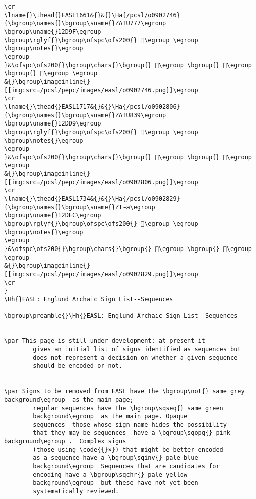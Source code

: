 \begin{verbatim}
\cr
\lname{}\thead{}EASL1661&{}&{}\Ha{/pcsl/o0902746}{\bgroup\names{}\bgroup\sname{}ZATU777\egroup
\bgroup\uname{}12D9F\egroup
\bgroup\rglyf{}\bgroup\ofspc\ofs200{} 𒶟\egroup \egroup
\bgroup\notes{}\egroup
\egroup
}&\ofspc\ofs200{}\bgroup\chars{}\bgroup{} 𒶟\egroup \bgroup{} 𒶠\egroup \bgroup{} 𒶡\egroup \egroup
&{}\bgroup\imageinline{}[[img:src=/pcsl/pepc/images/easl/o0902746.png]]\egroup
\cr
\lname{}\thead{}EASL1717&{}&{}\Ha{/pcsl/o0902806}{\bgroup\names{}\bgroup\sname{}ZATU839\egroup
\bgroup\uname{}12DD9\egroup
\bgroup\rglyf{}\bgroup\ofspc\ofs200{} 𒷙\egroup \egroup
\bgroup\notes{}\egroup
\egroup
}&\ofspc\ofs200{}\bgroup\chars{}\bgroup{} 𒷙\egroup \bgroup{} 𒷚\egroup \egroup
&{}\bgroup\imageinline{}[[img:src=/pcsl/pepc/images/easl/o0902806.png]]\egroup
\cr
\lname{}\thead{}EASL1734&{}&{}\Ha{/pcsl/o0902829}{\bgroup\names{}\bgroup\sname{}ZI∼a\egroup
\bgroup\uname{}12DEC\egroup
\bgroup\rglyf{}\bgroup\ofspc\ofs200{} 𒷬\egroup \egroup
\bgroup\notes{}\egroup
\egroup
}&\ofspc\ofs200{}\bgroup\chars{}\bgroup{} 𒷫\egroup \bgroup{} 𒷬\egroup \egroup
&{}\bgroup\imageinline{}[[img:src=/pcsl/pepc/images/easl/o0902829.png]]\egroup
\cr
}
\Hh{}EASL: Englund Archaic Sign List--Sequences

\bgroup\preamble{}\Hh{}EASL: Englund Archaic Sign List--Sequences


\par This page is still under development: at present it
	    gives an initial list of signs identified as sequences but
	    does not represent a decision on whether a given sequence
	    should be encoded or not.


\par Signs to be removed from EASL have the \bgroup\not{} same grey background\egroup  as the main page;
	    regular sequences have the \bgroup\sqseq{} same green
	    background\egroup  as the main page. Opaque
	    sequences--those whose sign name hides the possibility
	    that they may be sequences--have a \bgroup\sqopq{} pink background\egroup .  Complex signs
	    (those using \code{{}×}) that might be better encoded
	    as a sequence have a \bgroup\sqinv{} pale blue
	    background\egroup  Sequences that are candidates for
	    encoding have a \bgroup\sqchr{} pale yellow
	    background\egroup  but these have not yet been
	    systematically reviewed.


\end{verbatim}
